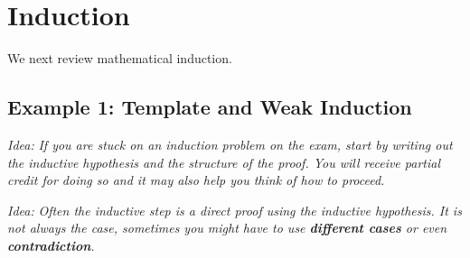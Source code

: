 \documentclass[12pt,letterpaper]{article}
\newcommand{\idea}{\textit{Idea:} }
\begin{document}
\section{Induction}

We next review mathematical induction.

\subsection{Example 1: Template and Weak Induction}

\idea \textit{If you are stuck on an induction problem on the exam, start by writing out the inductive hypothesis and the structure of the proof. You will receive partial credit for doing so and it may also help you think of how to proceed.}

\idea \textit{Often the inductive step is a direct proof using the inductive hypothesis. It is not always the case, sometimes you might have to use \textbf{different cases} or even \textbf{contradiction}.}
\end{document}
